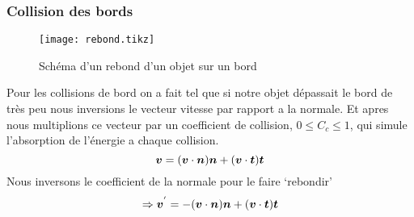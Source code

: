         \subsubsection{Collision des bords}
            \begin{wrapfigure}{r}{0.25\textwidth}
                \centering
                \texttt{[image: rebond.tikz]}
                \caption{Schéma d'un rebond d'un objet sur un bord}
            \end{wrapfigure}
            Pour les collisions de bord on a fait tel que si notre objet dépassait le bord de très peu nous inversions le vecteur vitesse par rapport a la normale. Et apres nous multiplions ce vecteur par un coefficient de collision, $0 \leq C_c \leq 1$, qui simule l’absorption de l'énergie a chaque collision. \\
            \begin{equation}
                \vb*{v} = (\vb*{v}\cdot\vb*{n})\vb*{n} +(\vb*{v}\cdot\vb*{t})\vb*{t}
            \end{equation}
            Nous inversons le coefficient de la normale pour le faire `rebondir'
            \begin{equation}
                \Rightarrow\vb*{v}^{'} = -(\vb*{v}\cdot\vb*{n})\vb*{n} + (\vb*{v}\cdot\vb*{t})\vb*{t}
            \end{equation}
